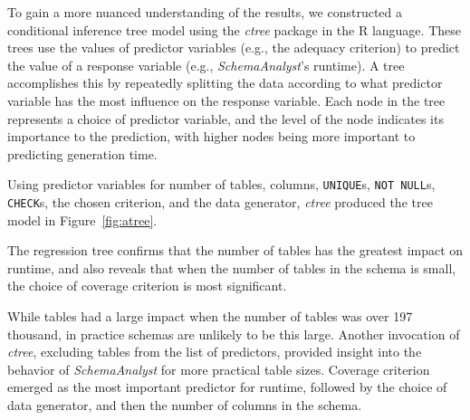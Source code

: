 
To gain a more nuanced understanding of the results, we constructed a conditional inference tree model using the
\textit{ctree} package in the R language. These trees use the values of predictor variables (e.g., the adequacy
criterion) to predict the value of a response variable (e.g., {\em SchemaAnalyst}'s runtime). A tree accomplishes this
by repeatedly splitting the data according to what predictor variable has the most influence on the response variable.
Each node in the tree represents a choice of predictor variable, and the level of the node indicates its importance to
the prediction, with higher nodes being more important to predicting generation time.



Using predictor variables for number of tables, columns, {\tt UNIQUE}s, {\tt NOT NULL}s, {\tt CHECK}s, the chosen
criterion, and the data generator, \textit{ctree} produced the tree model in Figure~\ref{fig:atree}.

The regression tree confirms that the number of tables has the greatest impact on runtime, and also reveals
that when the number of tables in the schema is small, the choice of coverage criterion is most significant.

While tables had a large impact when the number of tables was over 197 thousand, in practice schemas are unlikely to be
this large. Another invocation of \textit{ctree}, excluding tables from the list of predictors, provided insight into
the behavior of \textit{SchemaAnalyst} for more practical table sizes. Coverage criterion emerged as the most important
predictor for runtime, followed by the choice of data generator, and then the number of columns in the schema.
